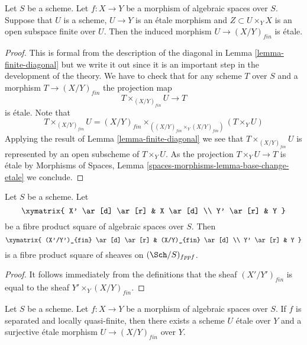 \begin{lemma}
\label{lemma-finite-criterion-etale}
Let $S$ be a scheme.
Let $f : X \to Y$ be a morphism of algebraic spaces over $S$.
Suppose that $U$ is a scheme, $U \to Y$ is an \'etale morphism and
$Z \subset U \times_Y X$ is an open subspace finite over $U$.
Then the induced morphism $U \to (X/Y)_{fin}$ is \'etale.
\end{lemma}

\begin{proof}
This is formal from the description of the diagonal in
Lemma \ref{lemma-finite-diagonal}
but we write it out since it is an important step in the development
of the theory. We have to check that for any scheme $T$ over $S$ and a morphism
$T \to (X/Y)_{fin}$ the projection map
$$
T \times_{(X/Y)_{fin}} U \longrightarrow T
$$
is \'etale. Note that
$$
T \times_{(X/Y)_{fin}} U
=
(X/Y)_{fin} \times_{((X/Y)_{fin} \times_Y (X/Y)_{fin})} (T \times_Y U)
$$
Applying the result of
Lemma \ref{lemma-finite-diagonal}
we see that $T \times_{(X/Y)_{fin}} U$ is represented by an open subscheme of
$T \times_Y U$. As the projection $T \times_Y U \to T$ is \'etale by
Morphisms of Spaces, Lemma \ref{spaces-morphisms-lemma-base-change-etale}
we conclude.
\end{proof}

\begin{lemma}
\label{lemma-finite-pullback}
Let $S$ be a scheme.
Let
$$
\xymatrix{
X' \ar[d] \ar[r] & X \ar[d] \\
Y' \ar[r] & Y
}
$$
be a fibre product square of algebraic spaces over $S$. Then
$$
\xymatrix{
(X'/Y')_{fin} \ar[d] \ar[r] & (X/Y)_{fin} \ar[d] \\
Y' \ar[r] & Y
}
$$
is a fibre product square of sheaves on $(\Sch/S)_{fppf}$.
\end{lemma}

\begin{proof}
It follows immediately from the definitions that
the sheaf $(X'/Y')_{fin}$ is equal to the sheaf
$Y' \times_Y (X/Y)_{fin}$.
\end{proof}

\begin{lemma}
\label{lemma-finite-surjective-etale-cover}
Let $S$ be a scheme.
Let $f : X \to Y$ be a morphism of algebraic spaces over $S$.
If $f$ is separated and locally quasi-finite, then there exists a
scheme $U$ \'etale over $Y$ and a surjective \'etale morphism
$U \to (X/Y)_{fin}$ over $Y$.
\end{lemma}

